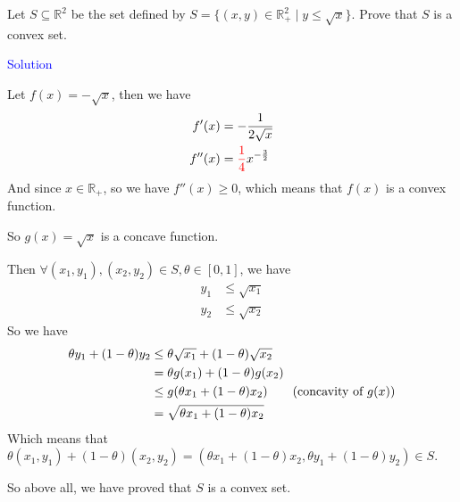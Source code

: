 Let $S \subseteq \mathbb{R}^2$ be the set defined by $S = \{(x, y) \in \mathbb{R}_+^2 \mid y \leq \sqrt{x}\}$. Prove that $S$ is a convex set. 

\textcolor{blue}{Solution}

Let $f(x)=-\sqrt{x}$, then we have
\begin{align*}
f'(x) &= -\dfrac{1}{2\sqrt{x}} \\
f''(x) &= \textcolor{red}{\dfrac{1}{4}}x^{-\frac{3}{2}}
\end{align*}
And since $x\in \mathbb{R}_+$, so we have $f''(x) \geq 0$, which means that $f(x)$ is a convex function.

So $g(x)=\sqrt{x}$ is a concave function.

Then $\forall (x_1, y_1), (x_2, y_2) \in S, \theta\in[0,1]$, we have
\begin{align*}
y_1 &\leq \sqrt{x_1} \\
y_2 &\leq \sqrt{x_2}
\end{align*}
So we have
\begin{align*}
\theta y_1 + (1-\theta)y_2 &\leq \theta\sqrt{x_1} + (1-\theta)\sqrt{x_2} \\
&= \theta g(x_1) + (1-\theta)g(x_2) \\
&\leq g(\theta x_1 + (1-\theta)x_2) \text{\quad\quad (concavity of $g(x)$)} \\
&= \sqrt{\theta x_1 + (1-\theta)x_2}
\end{align*}
Which means that $\theta(x_1, y_1) + (1-\theta)(x_2, y_2) = \left(\theta x_1 + (1-\theta)x_2, \theta y_1 + (1-\theta)y_2\right) \in S$.

So above all, we have proved that $S$ is a convex set.

\newpage